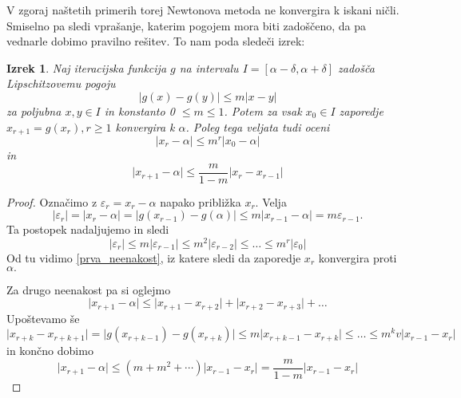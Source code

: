 \documentclass[12pt,a4paper]{amsart}
\theoremstyle{definition} %
\theoremstyle{plain} %
\newtheorem{izrek}[definicija]{Izrek}
\begin{document}
V zgoraj naštetih primerih torej Newtonova metoda ne konvergira k iskani ničli. Smiselno pa sledi vprašanje, katerim pogojem mora biti zadoščeno, da pa 
vednarle dobimo pravilno rešitev. To nam poda sledeči izrek:
\begin{izrek} 
    Naj iteracijska funkcija $g$ na intervalu $I = [ \alpha - \delta,\alpha + \delta ]$ zadošča Lipschitzovemu pogoju
    \[
        \lvert g(x) - g(y) \rvert \leq m \lvert x - y \rvert
    \]
    za poljubna $x,y \in I$ in konstanto 0 $\leq m \leq 1$. Potem za vsak $x_{0} \in I$ zaporedje $x_{r+1} = g(x_{r}), r \geq 1$ konvergira k $\alpha$. Poleg tega veljata
    tudi oceni
    \begin{equation}\label{prva_neenakost}
        \lvert x_{r} - \alpha \rvert \leq m^{r}\lvert x_{0} - \alpha \rvert
    \end{equation}
    in
    \begin{equation}
        \lvert x_{r+1} - \alpha \rvert \leq \frac{m}{1-m} \lvert x_{r} - x_{r-1} \rvert
    \end{equation}
\end{izrek}
\begin{proof}
    Označimo z $\varepsilon_{r} = x_{r} - \alpha $ napako približka $x_{r}.$ Velja
    \[
        \lvert \varepsilon_{r} \rvert = \lvert x_{r} - \alpha \rvert = \lvert g(x_{r-1}) - g(\alpha) \rvert \leq m\lvert x_{r-1} - \alpha \rvert = m \varepsilon_{r-1}.
    \]
    Ta postopek nadaljujemo in sledi
    \[
        \lvert \varepsilon_{r} \rvert \leq m \lvert \varepsilon_{r-1} \rvert \leq m^{2} \lvert \varepsilon_{r-2} \rvert \leq \ldots \leq m^{r} \lvert\varepsilon_{0} \rvert
    \]
    Od tu vidimo \eqref{prva_neenakost}, iz katere sledi da zaporedje $x_{r}$ konvergira proti $\alpha.$

    Za drugo neenakost pa si oglejmo
    \[
        \lvert x_{r+1} - \alpha \rvert \leq \lvert x_{r+1} - x_{r+2} \rvert + \lvert x_{r+2} - x_{r+3} \rvert + \ldots
    \]
    Upoštevamo še
    \[
        \lvert x_{r+k} - x_{r+k+1} \rvert = \lvert g(x_{r+k-1}) - g(x_{r+k}) \rvert \leq m \lvert x_{r+k-1} - x_{r+k} \rvert \leq \ldots \leq m^{k}v\lvert x_{r-1} - x_{r}\rvert 
    \]
    in končno dobimo
    \[
        \lvert x_{r+1} - \alpha\rvert \leq (m + m^2 + \cdots)\lvert x_{r-1} - x_{r}\rvert = \frac{m}{1-m}\lvert x_{r-1} - x_{r}\rvert
    \]
\end{proof}
\end{document}
